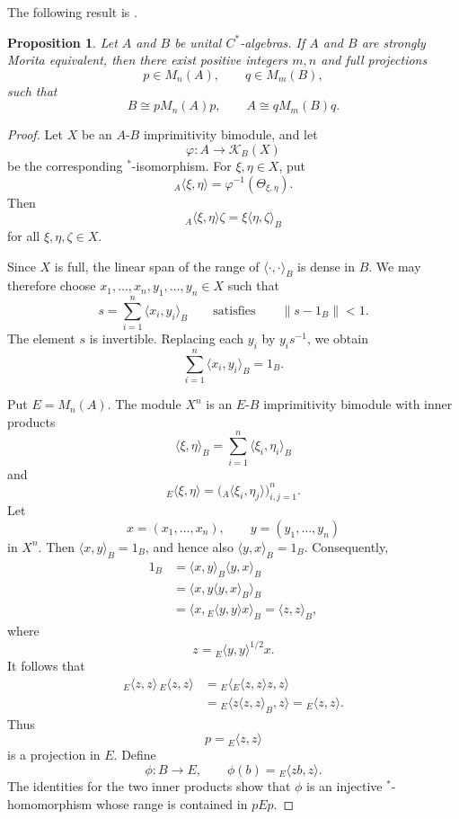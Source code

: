 \documentclass{book}
\newtheorem{proposition}[definition]{Proposition}
\def\cstars{\(C^*\)-algebras}
\begin{document}
The following result is \cite[Proposition~2.1]{Rieffel1981}.
\begin{proposition}\label{prop:RieffelFullCorners}
  Let \(A\) and \(B\) be unital \cstars. If \(A\) and \(B\) are strongly
  Morita equivalent, then there exist positive integers \(m,n\) and full
  projections
  \[
    p\in M_n(A),
    \qquad
    q\in M_m(B),
  \]
  such that
  \[
    B\cong pM_n(A)p,
    \qquad
    A\cong qM_m(B)q.
  \]
\end{proposition}
\begin{proof}
  Let \(X\) be an \(A\)-\(B\) imprimitivity bimodule, and let
  \[
    \varphi:A\longrightarrow\mathcal K_B(X)
  \]
  be the corresponding \(^*\)-isomorphism. For \(\xi,\eta\in X\), put
  \[
    {}_A\langle\xi,\eta\rangle
    =
    \varphi^{-1}(\Theta_{\xi,\eta}).
  \]
  Then
  \[
    {}_A\langle\xi,\eta\rangle\zeta
    =
    \xi\langle\eta,\zeta\rangle_B
  \]
  for all \(\xi,\eta,\zeta\in X\).

  Since \(X\) is full, the linear span of the range of
  \(\langle\cdot,\cdot\rangle_B\) is dense in \(B\). We may therefore
  choose \(x_1,\ldots,x_n,y_1,\ldots,y_n\in X\) such that
  \[
    s=\sum_{i=1}^n\langle x_i,y_i\rangle_B
    \qquad\text{satisfies}\qquad
    \|s-1_B\|<1.
  \]
  The element \(s\) is invertible. Replacing each \(y_i\) by
  \(y_i s^{-1}\), we obtain
  \[
    \sum_{i=1}^n\langle x_i,y_i\rangle_B=1_B.
  \]

  Put \(E=M_n(A)\). The module \(X^n\) is an \(E\)-\(B\) imprimitivity
  bimodule with inner products
  \[
    \langle\xi,\eta\rangle_B
    =
    \sum_{i=1}^n\langle\xi_i,\eta_i\rangle_B
  \]
  and
  \[
    {}_E\langle\xi,\eta\rangle
    =
    \bigl({}_A\langle\xi_i,\eta_j\rangle\bigr)_{i,j=1}^n.
  \]
  Let
  \[
    x=(x_1,\ldots,x_n),
    \qquad
    y=(y_1,\ldots,y_n)
  \]
  in \(X^n\). Then \(\langle x,y\rangle_B=1_B\), and hence also
  \(\langle y,x\rangle_B=1_B\). Consequently,
  \begin{align*}
    1_B
    &=\langle x,y\rangle_B\langle y,x\rangle_B\\
    &=\langle x,y\langle y,x\rangle_B\rangle_B\\
    &=\langle x,{}_E\langle y,y\rangle x\rangle_B
      =\langle z,z\rangle_B,
  \end{align*}
  where
  \[
    z={}_E\langle y,y\rangle^{1/2}x.
  \]
  It follows that
  \begin{align*}
    {}_E\langle z,z\rangle\,{}_E\langle z,z\rangle
    &={}_E\langle{}_E\langle z,z\rangle z,z\rangle\\
    &={}_E\langle z\langle z,z\rangle_B,z\rangle
      ={}_E\langle z,z\rangle.
  \end{align*}
  Thus
  \[
    p={}_E\langle z,z\rangle
  \]
  is a projection in \(E\). Define
  \[
    \phi:B\longrightarrow E,
    \qquad
    \phi(b)={}_E\langle zb,z\rangle.
  \]
  The identities for the two inner products show that \(\phi\) is an
  injective \(^*\)-homomorphism whose range is contained in \(pEp\).


\end{proof}
\end{document}
